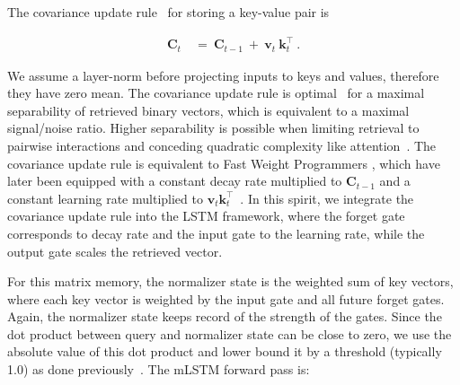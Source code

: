 The covariance update rule~\citep{Sejnowski:77,Dayan:91} for storing a key-value pair is

\begin{align}
\mathbf{C}_t \ &= \ \mathbf{C}_{t-1} \ + \ \mathbf{v}_{t} \ \mathbf{k}_t^\top \ .
\end{align}

We assume a layer-norm before projecting inputs to keys and values, therefore they have zero mean. The covariance update rule is optimal~\citep{Dayan:91} for a maximal separability of retrieved binary vectors, which is equivalent to a maximal signal/noise ratio. Higher separability is possible when limiting retrieval to pairwise interactions and conceding quadratic complexity like attention~\citep{Krotov:16,Krotov:17,Ramsauer:21}. The covariance update rule is equivalent to Fast Weight Programmers \citep{Schmidhuber:92ncfastweights,Schlag:21}, which have later been equipped with a constant decay rate multiplied to $\mathbf{C}_{t-1}$ and a constant learning rate multiplied to 
$\mathbf{v}_{t} \mathbf{k}_t ^\top$~\citep{Ba:16}.
In this spirit, we integrate the covariance update rule into the LSTM framework, where the forget gate corresponds to decay rate and the input gate to the learning rate, while the output gate scales the retrieved vector.

For this matrix memory, the normalizer state is the weighted sum of key vectors, where each key vector is weighted by the input gate and all future forget gates. Again, the normalizer state keeps record of the strength of the gates. Since the dot product between query and normalizer state can be close to zero, we use the absolute value of this dot product and lower bound it by a threshold (typically 1.0) as done previously~\citep{Sun:23arxiv}. The mLSTM forward pass is:

